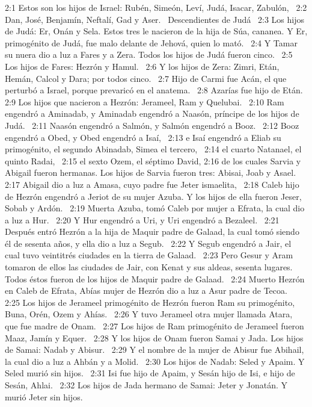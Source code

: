 2:1 Estos son los hijos de Israel: Rubén, Simeón, Leví, Judá, Isacar, Zabulón,  
2:2 Dan, José, Benjamín, Neftalí, Gad y Aser.  
Descendientes de Judá  
2:3 Los hijos de Judá: Er, Onán y Sela. Estos tres le nacieron de la hija de Súa, cananea. Y Er, primogénito de Judá, fue malo delante de Jehová, quien lo mató.  
2:4 Y Tamar su nuera dio a luz a Fares y a Zera. Todos los hijos de Judá fueron cinco.  
2:5 Los hijos de Fares: Hezrón y Hamul.  
2:6 Y los hijos de Zera: Zimri, Etán, Hemán, Calcol y Dara; por todos cinco.  
2:7 Hijo de Carmi fue Acán, el que perturbó a Israel, porque prevaricó en el anatema.  
2:8 Azarías fue hijo de Etán.  
2:9 Los hijos que nacieron a Hezrón: Jerameel, Ram y Quelubai.  
2:10 Ram engendró a Aminadab, y Aminadab engendró a Naasón, príncipe de los hijos de Judá.  
2:11 Naasón engendró a Salmón, y Salmón engendró a Booz.  
2:12 Booz engendró a Obed, y Obed engendró a Isaí,  
2:13 e Isaí engendró a Eliab su primogénito, el segundo Abinadab, Simea el tercero,  
2:14 el cuarto Natanael, el quinto Radai,  
2:15 el sexto Ozem, el séptimo David, 
2:16 de los cuales Sarvia y Abigail fueron hermanas. Los hijos de Sarvia fueron tres: Abisai, Joab y Asael.  
2:17 Abigail dio a luz a Amasa, cuyo padre fue Jeter ismaelita,  
2:18 Caleb hijo de Hezrón engendró a Jeriot de su mujer Azuba. Y los hijos de ella fueron Jeser, Sobab y Ardón.  
2:19 Muerta Azuba, tomó Caleb por mujer a Efrata, la cual dio a luz a Hur.  
2:20 Y Hur engendró a Uri, y Uri engendró a Bezaleel.  
2:21 Después entró Hezrón a la hija de Maquir padre de Galaad, la cual tomó siendo él de sesenta años, y ella dio a luz a Segub.  
2:22 Y Segub engendró a Jair, el cual tuvo veintitrés ciudades en la tierra de Galaad.  
2:23 Pero Gesur y Aram tomaron de ellos las ciudades de Jair, con Kenat y sus aldeas, sesenta lugares. Todos éstos fueron de los hijos de Maquir padre de Galaad.  
2:24 Muerto Hezrón en Caleb de Efrata, Abías mujer de Hezrón dio a luz a Asur padre de Tecoa.  
2:25 Los hijos de Jerameel primogénito de Hezrón fueron Ram su primogénito, Buna, Orén, Ozem y Ahías.  
2:26 Y tuvo Jerameel otra mujer llamada Atara, que fue madre de Onam.  
2:27 Los hijos de Ram primogénito de Jerameel fueron Maaz, Jamín y Equer.  
2:28 Y los hijos de Onam fueron Samai y Jada. Los hijos de Samai: Nadab y Abisur.  
2:29 Y el nombre de la mujer de Abisur fue Abihail, la cual dio a luz a Ahbán y a Molid.  
2:30 Los hijos de Nadab: Seled y Apaim. Y Seled murió sin hijos.  
2:31 Isi fue hijo de Apaim, y Sesán hijo de Isi, e hijo de Sesán, Ahlai.  
2:32 Los hijos de Jada hermano de Samai: Jeter y Jonatán. Y murió Jeter sin hijos.  
